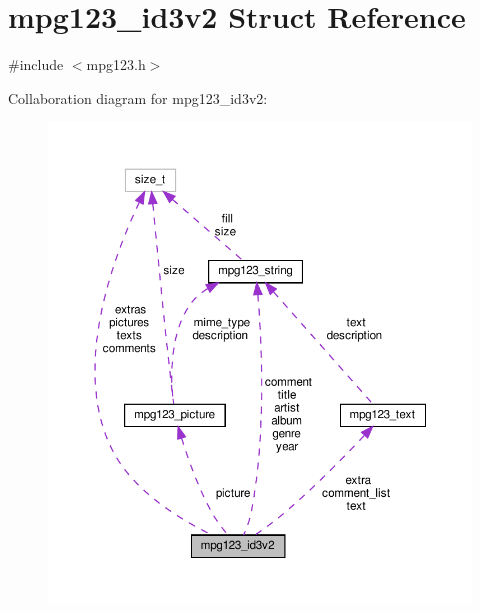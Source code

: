 \hypertarget{structmpg123__id3v2}{}\section{mpg123\+\_\+id3v2 Struct Reference}
\label{structmpg123__id3v2}


{\ttfamily \#include $<$mpg123.\+h$>$}



Collaboration diagram for mpg123\+\_\+id3v2\+:
\nopagebreak
\begin{figure}[H]
\begin{center}
\leavevmode
\includegraphics[width=350pt]{structmpg123__id3v2__coll__graph}
\end{center}
\end{figure}
